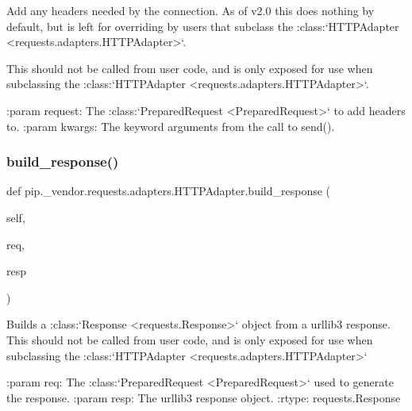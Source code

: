 \begin{DoxyVerb}Add any headers needed by the connection. As of v2.0 this does
nothing by default, but is left for overriding by users that subclass
the :class:`HTTPAdapter <requests.adapters.HTTPAdapter>`.

This should not be called from user code, and is only exposed for use
when subclassing the
:class:`HTTPAdapter <requests.adapters.HTTPAdapter>`.

:param request: The :class:`PreparedRequest <PreparedRequest>` to add headers to.
:param kwargs: The keyword arguments from the call to send().
\end{DoxyVerb}
 \mbox{\label{classpip_1_1__vendor_1_1requests_1_1adapters_1_1HTTPAdapter_ae82a7e8c98f9f7e8317f903249a59444}} 
\subsubsection{\texorpdfstring{build\+\_\+response()}{build\_response()}}
{\footnotesize\ttfamily def pip.\+\_\+vendor.\+requests.\+adapters.\+H\+T\+T\+P\+Adapter.\+build\+\_\+response (\begin{DoxyParamCaption}\item[{}]{self,  }\item[{}]{req,  }\item[{}]{resp }\end{DoxyParamCaption})}

\begin{DoxyVerb}Builds a :class:`Response <requests.Response>` object from a urllib3
response. This should not be called from user code, and is only exposed
for use when subclassing the
:class:`HTTPAdapter <requests.adapters.HTTPAdapter>`

:param req: The :class:`PreparedRequest <PreparedRequest>` used to generate the response.
:param resp: The urllib3 response object.
:rtype: requests.Response
\end{DoxyVerb}
 \mbox{\label{classpip_1_1__vendor_1_1requests_1_1adapters_1_1HTTPAdapter_a52325d2ffdf6e613ebbbe516c989ff08}} 

